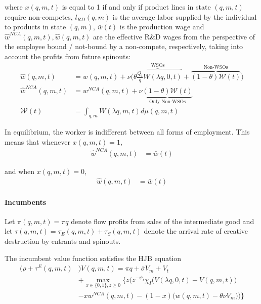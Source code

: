 \documentclass[12pt,english]{article}
\theoremstyle{remark}
\begin{document}
where $x(q,m,t)$ is equal to 1 if and only if product lines in state $(q,m,t)$ require non-competes, $l_{RD}(q,m)$ is the average labor supplied by the individual to products in state $(q,m)$,  $\bar{w}(t)$ is the production wage and $\hat{w}^{NCA}(q,m,t),\hat{w}(q,m,t)$ are the effective R\&D wages from the perspective of the employee bound / not-bound by a non-compete, respectively, taking into account the profits from future spinouts: 
\begin{align}
\hat{w}(q,m,t) &=  w(q,m,t) + \nu \Big( \overbrace{\theta \frac{Q_t}{q} W(\lambda q,0,t)}^{\textrm{WSOs}} + \overbrace{(1-\theta) \mathcal{W}(t)}^{\textrm{Non-WSOs}} \Big) \label{worker_effective_wage}\\
\hat{w}^{NCA}(q,m,t) &= w^{NCA}(q,m,t) + \nu \underbrace{(1-\theta) \mathcal{W}(t)}_{\textrm{Only Non-WSOs}} \label{worker_effective_wage_NCA}\\ 
\mathcal{W}(t) &= \int_{q,m} W(\lambda q,m,t) d\mu(q,m,t)
\end{align}

In equilibrium, the worker is indifferent between all forms of employment. This means that whenever $x(q,m,t) = 1$, 
\begin{align}
\hat{w}^{NCA}(q,m,t) &= \bar{w}(t) \label{wage_rd_NCA}
\end{align}

and when $x(q,m,t) = 0$, 
\begin{align}
\hat{w}(q,m,t) &= \bar{w}(t) \label{wage_rd}
\end{align}


\paragraph{Incumbents}

Let $\pi(q,m,t) = \pi q$ denote flow profits from sales of the intermediate good and let $\tau(q,m,t) = \tau_E(q,m,t) + \tau_S(q,m,t)$ denote the arrival rate of creative destruction by entrants and spinouts. 

The incumbent value function satisfies the HJB equation
\begin{align}
	\big(\rho + \tau^E(q,m,t)& \big)V(q,m,t) = \pi q + \bar{\sigma} V_m + V_t  \nonumber \\
	                           &+ \max_{x \in \{0,1\}, z \ge 0} \Bigg\{ z \Big( z^{-\psi_I} \chi_I \big( V(\lambda q, 0, t) - V(q,m,t) \big)  \nonumber \\
	                           &- x w^{NCA}(q,m,t) - (1-x) \big(w(q,m,t) - \theta \nu V_m \big)\Big)    \Bigg\}
\end{align}
\end{document}
